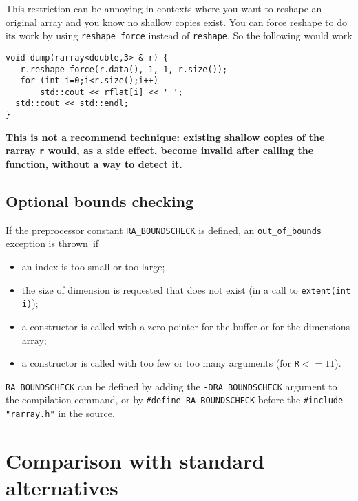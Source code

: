 \documentclass[11pt,twoside]{article}
\begin{document}
This restriction can be annoying in contexts where you want to
reshape an original array and you know no shallow copies exist.  You can force
reshape to do its work by using \texttt{reshape\_force} instead of \texttt{reshape}. So the following would work
\vspace{-9pt}
\begin{framed}\vspace{-18pt}%
\begin{verbatim}
void dump(rarray<double,3> & r) {
   r.reshape_force(r.data(), 1, 1, r.size());
   for (int i=0;i<r.size();i++)
       std::cout << rflat[i] << ' ';
  std::cout << std::endl;
}
\end{verbatim}%
\vspace{-12pt}
\end{framed}\vspace{-8pt}
\textbf{This is not a recommend technique: existing shallow copies of the rarray \texttt{r} would, as a side effect, become invalid after calling the function, without a way to detect it.}


\subsection{Optional bounds checking}

If the preprocessor constant \texttt{{\tt RA\_BOUNDSCHECK}} is defined, an
\texttt{out\_of\_bounds} exception is thrown~if
\begin{itemize}\itemsep0pt\parskip3pt
\item an index is too small or too large;
\item the size of dimension is requested that does not exist (in a call to \texttt{extent(int i)});
\item a constructor is called with a zero pointer for the buffer or for the dimensions array;
\item a constructor is called with too few or too many arguments (for \texttt{R}$<=11$).
\end{itemize}
\texttt{{\tt RA\_BOUNDSCHECK}} can be defined by
adding the {\tt -DRA\_BOUNDSCHECK} argument to the compilation command, or
by \texttt{{\tt\#define RA\_BOUNDSCHECK}} before
the \texttt{{\tt\#include "rarray.h"}} in the source.

\section{Comparison with standard alternatives}
\end{document}
